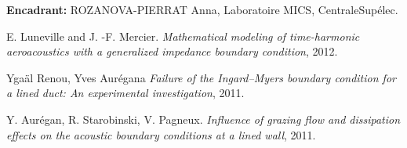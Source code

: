 \documentclass[12pt,a4paper]{article}
\begin{document}
\medskip
\noindent \textbf{Encadrant:} ROZANOVA-PIERRAT Anna, Laboratoire MICS, CentraleSupélec. \par
\vspace{-\baselineskip}
\begin{thebibliography}{1}


E. Luneville and J. -F. Mercier. {\em Mathematical modeling of time-harmonic aeroacoustics with a generalized impedance boundary condition}, 2012.

Ygaäl Renou, Yves Aurégana {\em Failure of the Ingard–Myers boundary condition for a lined duct: An experimental investigation}, 2011.

Y. Aurégan, R. Starobinski,  V. Pagneux.
{\em Influence of grazing flow and dissipation effects on the acoustic boundary conditions at a lined wall}, 2011.

\end{thebibliography}


\end{document}

